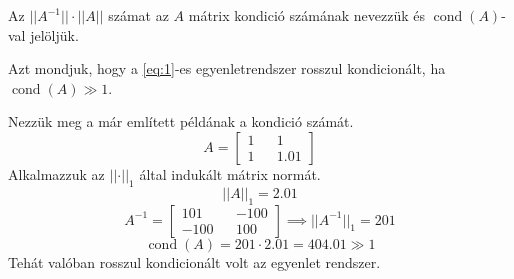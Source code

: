 \begin{definition}
    Az $\lvert \lvert A^{-1} \rvert  \rvert  \cdot \lvert \lvert A \rvert  \rvert$ számat az $A$ mátrix kondició számának nevezzük és $\operatorname{cond}(A)$-val jelöljük.
\end{definition}

\begin{definition}
    Azt mondjuk, hogy a \ref{eq:1}-es egyenletrendszer rosszul kondicionált, ha $\operatorname{cond}(A) \gg 1$.
\end{definition}

\begin{pelda}
    Nezzük meg a már említett példának a kondició számát.
    \begin{equation*}
    A = \begin{bmatrix}
        1 && 1  \\
        1 && 1.01
    \end{bmatrix}
    \end{equation*}
    Alkalmazzuk az $\lvert \lvert \cdot \rvert \rvert_{1}$ által indukált mátrix normát.
    \begin{equation*}
        \lvert \lvert A \rvert  \rvert _{1} = 2.01
    \end{equation*}
    \begin{equation*}
        A^{-1} =
        \begin{bmatrix}
            101 && -100 \\
            -100 && 100
        \end{bmatrix}
        \implies \lvert \lvert A^{-1} \rvert  \rvert _{1} = 201
    \end{equation*}
    \begin{equation*}
        \operatorname{cond}(A) = 201 \cdot 2.01 = 404.01 \gg 1
    \end{equation*}
    Tehát valóban rosszul kondicionált volt az egyenlet rendszer.

\end{pelda}



